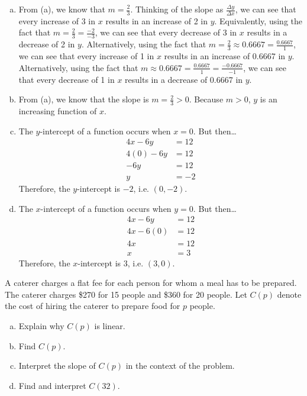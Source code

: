 \documentclass[12pt,letterpaper]{exam}
\begin{document}
\begin{questions}
{\begin{enumerate}[(a)]
\item From (a), we know that $m= \frac{2}{3}$. Thinking of the slope as $\frac{\Delta y}{\Delta x}$, we can see that every increase of 3 in $x$ results in an increase of 2 in $y$. Equivalently, using the fact that $m= \frac{2}{3}= \frac{-2}{-3}$, we can see that every decrease of 3 in $x$ results in a decrease of 2 in $y$. Alternatively, using the fact that $m= \frac{2}{3} \approx 0.6667= \frac{0.6667}{1}$, we can see that every increase of 1 in $x$ results in an increase of 0.6667 in $y$. Alternatively, using the fact that $m \approx 0.6667= \frac{0.6667}{1}= \frac{-0.6667}{-1}$, we can see that every decrease of 1 in $x$ results in a decrease of 0.6667 in $y$. 

\item From (a), we know that the slope is $m= \frac{2}{3} > 0$. Because $m > 0$, $y$ is an increasing function of $x$. 

\item The $y$-intercept of a function occurs when $x= 0$. But then\dots
	\[
	\begin{aligned}
	4x - 6y&= 12 \\
	4(0) - 6y&= 12 \\
	-6y&= 12 \\
	y&= -2
	\end{aligned}
	\]
Therefore, the $y$-intercept is $-2$, i.e. $(0, -2)$. 

\item The $x$-intercept of a function occurs when $y= 0$. But then\dots
	\[
	\begin{aligned}
	4x - 6y&= 12 \\
	4x - 6(0)&= 12 \\
	4x&= 12 \\
	x&= 3
	\end{aligned}
	\] 
Therefore, the $x$-intercept is $3$, i.e. $(3, 0)$. 
\end{enumerate}
}



\newpage
\question[10] A caterer charges a flat fee for each person for whom a meal has to be prepared. The caterer charges \$270 for 15 people and \$360 for 20 people. Let $C(p)$ denote the cost of hiring the caterer to prepare food for $p$ people. 
	\begin{enumerate}[(a)]
	\item Explain why $C(p)$ is linear.
	\item Find $C(p)$.
	\item Interpret the slope of $C(p)$ in the context of the problem. 
	\item Find and interpret $C(32)$. 
	\end{enumerate} \pspace


\end{questions}
\end{document}
